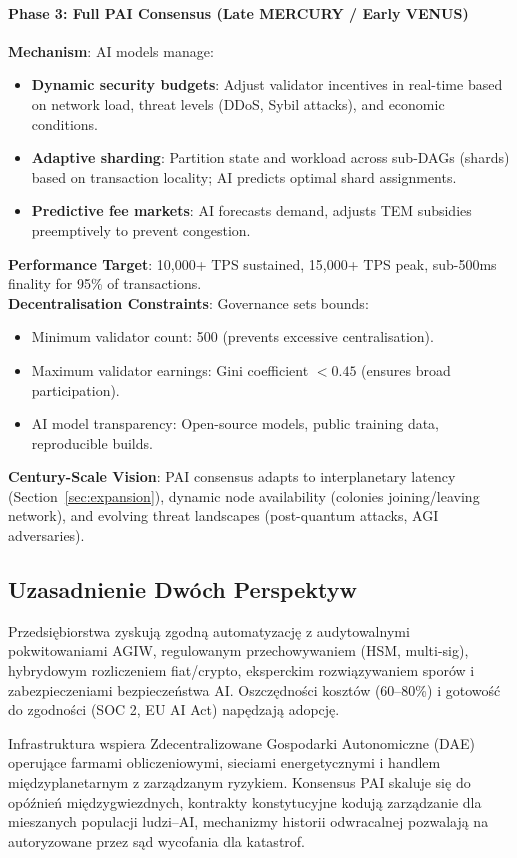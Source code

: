 \documentclass[11pt]{article}
\begin{document}
\paragraph{Phase 3: Full PAI Consensus (Late MERCURY / Early VENUS)}
\textbf{Mechanism}: AI models manage:
\begin{itemize}[noitemsep]
  \item \textbf{Dynamic security budgets}: Adjust validator incentives in real-time based on network load, threat levels (DDoS, Sybil attacks), and economic conditions.
  \item \textbf{Adaptive sharding}: Partition state and workload across sub-DAGs (shards) based on transaction locality; AI predicts optimal shard assignments.
  \item \textbf{Predictive fee markets}: AI forecasts demand, adjusts TEM subsidies preemptively to prevent congestion.
\end{itemize}
\textbf{Performance Target}: 10,000+ TPS sustained, 15,000+ TPS peak, sub-500ms finality for 95\% of transactions.\\
\textbf{Decentralisation Constraints}: Governance sets bounds:
\begin{itemize}[noitemsep]
  \item Minimum validator count: 500 (prevents excessive centralisation).
  \item Maximum validator earnings: Gini coefficient $<0.45$ (ensures broad participation).
  \item AI model transparency: Open-source models, public training data, reproducible builds.
\end{itemize}
\textbf{Century-Scale Vision}: PAI consensus adapts to interplanetary latency (Section~\ref{sec:expansion}), dynamic node availability (colonies joining/leaving network), and evolving threat landscapes (post-quantum attacks, AGI adversaries).

\subsection{Uzasadnienie Dwóch Perspektyw}
\begin{description}[style=nextline]
  \item[Krótkoterminowe (Era MERKURY)] Przedsiębiorstwa zyskują zgodną automatyzację z audytowalnymi pokwitowaniami AGIW, regulowanym przechowywaniem (HSM, multi-sig), hybrydowym rozliczeniem fiat/crypto, eksperckim rozwiązywaniem sporów i zabezpieczeniami bezpieczeństwa AI. Oszczędności kosztów (60--80\%) i gotowość do zgodności (SOC 2, EU AI Act) napędzają adopcję.
  \item[Skala Stuleci (WENUS przez ANDROMEDA)] Infrastruktura wspiera Zdecentralizowane Gospodarki Autonomiczne (DAE) operujące farmami obliczeniowymi, sieciami energetycznymi i handlem międzyplanetarnym z zarządzanym ryzykiem. Konsensus PAI skaluje się do opóźnień międzygwiezdnych, kontrakty konstytucyjne kodują zarządzanie dla mieszanych populacji ludzi--AI, mechanizmy historii odwracalnej pozwalają na autoryzowane przez sąd wycofania dla katastrof.
\end{description}
\end{document}
